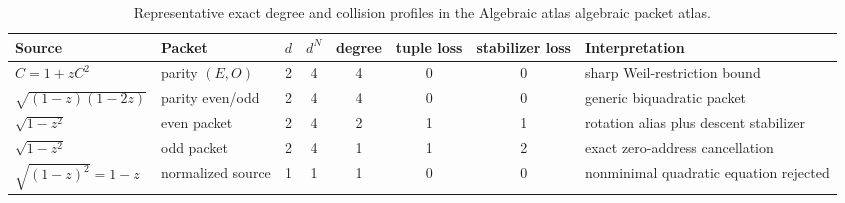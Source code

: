 \begin{table}[H]
\centering
\scriptsize
\caption{Representative exact degree and collision profiles in the Algebraic atlas algebraic packet atlas.}
\label{tab:block10-examples}
\begin{tabularx}{\textwidth}{@{}L{0.17\textwidth}L{0.14\textwidth}cccccY@{}}
\toprule
Source & Packet & $d$ & $d^N$ & degree & tuple loss & stabilizer loss & Interpretation\\
\midrule
$C=1+zC^2$ & parity $(E,O)$ & 2 & 4 & 4 & 0 & 0 & sharp Weil-restriction bound\\
$\sqrt{(1-z)(1-2z)}$ & parity even/odd & 2 & 4 & 4 & 0 & 0 & generic biquadratic packet\\
$\sqrt{1-z^2}$ & even packet & 2 & 4 & 2 & 1 & 1 & rotation alias plus descent stabilizer\\
$\sqrt{1-z^2}$ & odd packet & 2 & 4 & 1 & 1 & 2 & exact zero-address cancellation\\
$\sqrt{(1-z)^2}=1-z$ & normalized source & 1 & 1 & 1 & 0 & 0 & nonminimal quadratic equation rejected\\
\bottomrule
\end{tabularx}
\end{table}
